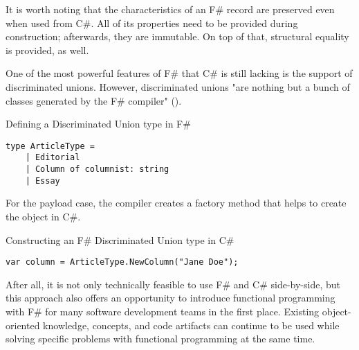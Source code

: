 It is worth noting that the characteristics of an F\# record are preserved even when used from C\#. All of its properties need to be provided during construction; afterwards, they are immutable. On top of that, structural equality is provided, as well.

One of the most powerful features of F\# that C\# is still lacking is the support of discriminated unions. However, discriminated unions "are nothing but a bunch of classes generated by the F\# compiler" (\cite[104]{nunez_mastering_2016}).

\begin{listing}[H]
\caption{Defining a Discriminated Union type in F\#}
\begin{verbatim}
type ArticleType =
    | Editorial
    | Column of columnist: string
    | Essay
\end{verbatim}
\end{listing}

For the payload case, the compiler creates a factory method that helps to create the object in C\#.

\begin{listing}[H]
\caption{Constructing an F\# Discriminated Union type in C\#}
\begin{verbatim}
var column = ArticleType.NewColumn("Jane Doe");
\end{verbatim}
\end{listing}

After all, it is not only technically feasible to use F\# and C\# side-by-side, but this approach also offers an opportunity to introduce functional programming with F\# for many software development teams in the first place. Existing object-oriented knowledge, concepts, and code artifacts can continue to be used while solving specific problems with functional programming at the same time.
